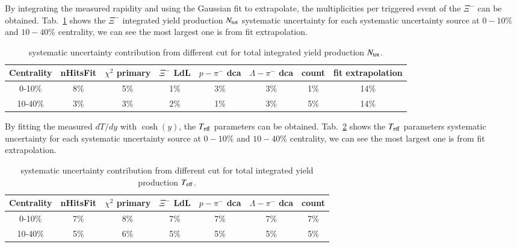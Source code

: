 By integrating the measured rapidity and using the Gaussian fit to extrapolate, the multiplicities per triggered event of the $\Xi^{-}$ can be obtained. Tab.~\ref{tab:syserr_N} shows the $\Xi^{-}$ integrated yield production $N_{\rm tot}$ systematic uncertainty for each systematic uncertainty source at $0-10\%$ and $10-40\%$ centrality, we can see the most largest one is from fit extrapolation. 
\begin{table}[]
    \centering
    \begin{tabular}{|c|c|c|c|c|c|c|c|}
    \hline
        Centrality & nHitsFit & $\chi^{2}$ primary & $\Xi^{-}$ LdL & $p-\pi^{-}$ dca & $\Lambda-\pi^{-}$ dca & count & fit extrapolation\\ \hline
        0-10\% & 8\% & 5\% & 1\% & 3\% & 3\% & 1\% & 14\%   \\
        10-40\% & 3\% & 3\% & 2\% & 1\% & 3\% & 5\% & 14\%   \\
        \hline
    \end{tabular}
    \caption{systematic uncertainty contribution from different cut for total integrated yield production $N_{\rm tot}$.}
    \label{tab:syserr_N}
\end{table}

By fitting the measured $dT/dy$ with $\cosh{(y)}$, the $T_{\rm eff}$ parameters can be obtained. Tab.~\ref{tab:syserr_T} shows the $T_{\rm eff}$ parameters systematic uncertainty for each systematic uncertainty source at $0-10\%$ and $10-40\%$ centrality, we can see the most largest one is from fit extrapolation. 
\begin{table}[]
    \centering
    \begin{tabular}{|c|c|c|c|c|c|c|}
    \hline
        Centrality & nHitsFit & $\chi^{2}$ primary & $\Xi^{-}$ LdL & $p-\pi^{-}$ dca & $\Lambda-\pi^{-}$ dca & count \\ \hline
        0-10\% &7\% & 8\% & 7\% & 7\% & 7\% & 7\%   \\
        10-40\% &5\% & 6\% & 5\% & 5\% & 5\% & 5\%   \\
        \hline
    \end{tabular}
    \caption{systematic uncertainty contribution from different cut for total integrated yield production $T_{\rm eff}$.}
    \label{tab:syserr_T}
\end{table} 

